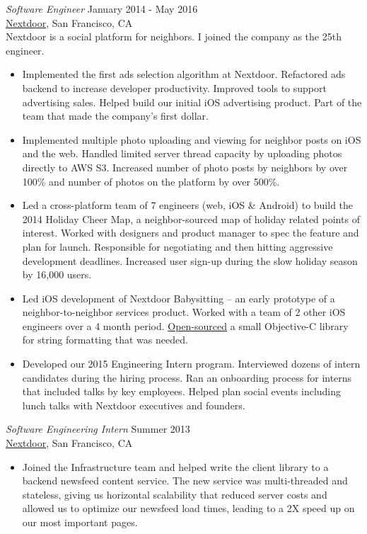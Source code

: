 \documentclass[margin, 10pt]{res}
\begin{document}
\begin{resume}
\begin{flushleft}
{\sl Software Engineer} \hfill January 2014 - May 2016 \\
\href{http://www.nextdoor.com}{Nextdoor}, San Francisco, CA \\
Nextdoor is a social platform for neighbors. I joined the company as the 25th engineer.
\begin{itemize} \itemsep -1pt %
\item Implemented the first ads selection algorithm at Nextdoor. Refactored ads backend to increase developer productivity. Improved tools to support advertising sales. Helped build our initial iOS advertising product. Part of the team that made the company's first dollar.
\item Implemented multiple photo uploading and viewing for neighbor posts on iOS and the web. Handled limited server thread capacity by uploading photos directly to AWS S3. Increased number of photo posts by neighbors by over 100\% and number of photos on the platform by over 500\%.
\item Led a cross-platform team of 7 engineers (web, iOS \& Android) to build the 2014 Holiday Cheer Map, a neighbor-sourced map of holiday related points of interest. Worked with designers and product manager to spec the feature and plan for launch. Responsible for negotiating and then hitting aggressive development deadlines. Increased user sign-up during the slow holiday season by 16,000 users.
\item Led iOS development of Nextdoor Babysitting -- an early prototype of a neighbor-to-neighbor services product. Worked with a team of 2 other iOS engineers over a 4 month period. \href{https://github.com/Nextdoor/NDPhraseParser}{Open-sourced} a small Objective-C library for string formatting that was needed.
\item Developed our 2015 Engineering Intern program. Interviewed dozens of intern candidates during the hiring process. Ran an onboarding process for interns that included talks by key employees. Helped plan social events including lunch talks with Nextdoor executives and founders.
\end{itemize}

{\sl Software Engineering Intern} \hfill Summer 2013 \\
\href{http://www.nextdoor.com}{Nextdoor}, San Francisco, CA
\begin{itemize}
\item Joined the Infrastructure team and helped write the client library to a backend newsfeed content service. The new service was multi-threaded and stateless, giving us horizontal scalability that reduced server costs and allowed us to optimize our newsfeed load times, leading to a 2X speed up on our most important pages.
\end{itemize}


\end{flushleft}
\end{resume}
\end{document}

